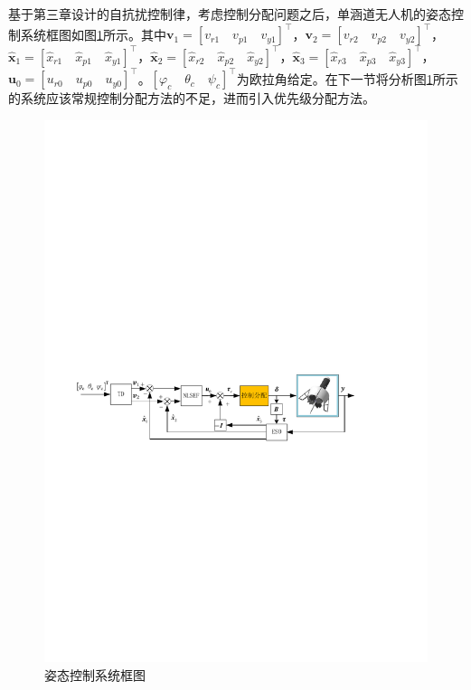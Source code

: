 基于第三章设计的自抗扰控制律，考虑控制分配问题之后，单涵道无人机的姿态控制系统框图如图\ref{tradi_base_ADRC}所示。其中$ \bm{v}_1=[v_{r1} \quad v_{p1}\quad v_{y1} ]^\top$，$ \bm{v}_2=[v_{r2} \quad v_{p2}\quad v_{y2} ]^\top $，$ \hat{\bm{x}}_1=[\hat{x}_{r1} \quad \hat{x}_{p1}\quad \hat{x}_{y1} ]^\top $，$ \hat{\bm{x}}_2=[\hat{x}_{r2} \quad \hat{x}_{p2}\quad \hat{x}_{y2} ]^\top $，$ \hat{\bm{x}}_3=[\hat{x}_{r3} \quad \hat{x}_{p3}\quad \hat{x}_{y3} ]^\top $，$ \bm{u}_0=[u_{r0} \quad u_{p0}\quad u_{y0} ]^\top $。$[\varphi_c \quad \theta_c \quad \psi_c]^\top$为欧拉角给定。在下一节将分析图\ref{tradi_base_ADRC}所示的系统应该常规控制分配方法的不足，进而引入优先级分配方法。
\begin{figure}[htbp]
	\centering	
	\includegraphics[scale=1]{Fig/tradi_base_ADRC.pdf}
	\caption{\label{tradi_base_ADRC}姿态控制系统框图}
\end{figure}
